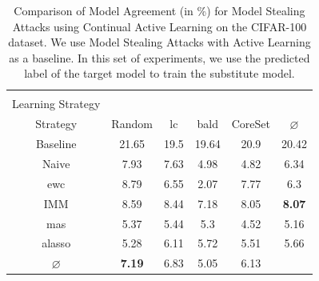 \begin{table}[h]
    \centering
    \begin{tabular}{c | c c c c | c} 
        \hline
        \diagbox[width=11em]{Active \\ Learning Strategy}{Continual Learning \\ Strategy} & Random & \gls{lc} & \gls{bald} & CoreSet & $\varnothing$\\ 
        \hline 
        Baseline & 21.65 & 19.5 & 19.64 & 20.9 & 20.42\\
        \hline
        Naive & 7.93 & 7.63 & 4.98 & 4.82 & 6.34\\
        \gls{ewc} & 8.79 & 6.55 & 2.07 & 7.77 & 6.3\\
        IMM & 8.59 & 8.44 & 7.18 & 8.05 & \textbf{8.07}\\
        \gls{mas} & 5.37 & 5.44 & 5.3 & 4.52 & 5.16\\
        \gls{alasso} & 5.28 & 6.11 & 5.72 & 5.51 & 5.66\\
        \hline
        $\varnothing$ & \textbf{7.19} & 6.83 & 5.05 & 6.13 \\
        \hline
    \end{tabular}
    \caption{Comparison of Model Agreement (in \%) for Model Stealing Attacks using Continual Active Learning on the CIFAR-100 dataset.
    We use Model Stealing Attacks with Active Learning as a baseline. In this set of experiments,
    we use the predicted label of the target model to train the substitute model.}
    \label{fig:ModelStealingCIFAR100Label}
\end{table}

